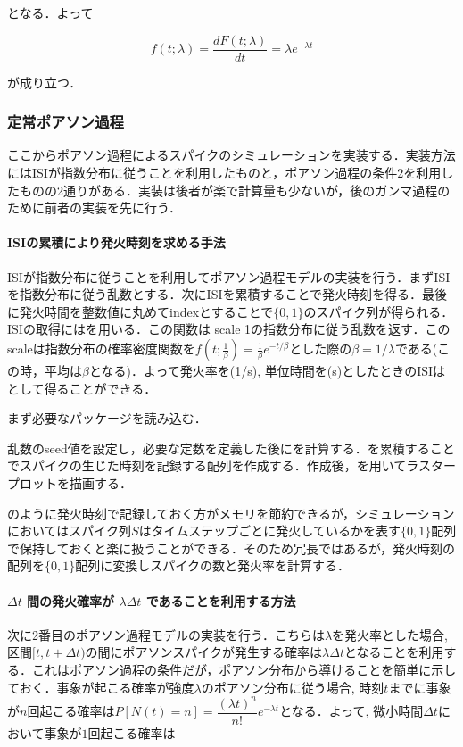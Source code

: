 となる．よって


\begin{equation}
f(t; \lambda)=\frac{dF(t; \lambda)}{dt}=\lambda e^{-\lambda t}
\end{equation}


が成り立つ．
\subsubsection{定常ポアソン過程}
ここからポアソン過程によるスパイクのシミュレーションを実装する．実装方法にはISIが指数分布に従うことを利用したものと，ポアソン過程の条件2を利用したものの2通りがある．実装は後者が楽で計算量も少ないが，後のガンマ過程のために前者の実装を先に行う．

\paragraph{ISIの累積により発火時刻を求める手法}
ISIが指数分布に従うことを利用してポアソン過程モデルの実装を行う．まずISIを指数分布に従う乱数とする．次にISIを累積することで発火時刻を得る．最後に発火時間を整数値に丸めてindexとすることで$\{0, 1\}$のスパイク列が得られる．ISIの取得にはを用いる．この関数は scale 1の指数分布に従う乱数を返す．このscaleは指数分布の確率密度関数を$f(t; \frac{1}{\beta}) = \frac{1}{\beta} e^{-t/\beta}$とした際の$\beta = 1/\lambda$である(この時，平均は$\beta$となる)．よって発火率を(1/s), 単位時間を(s)としたときのISIは として得ることができる．

まず必要なパッケージを読み込む．

乱数のseed値を設定し，必要な定数を定義した後にを計算する．を累積することでスパイクの生じた時刻を記録する配列を作成する．作成後，を用いてラスタープロットを描画する．



のように発火時刻で記録しておく方がメモリを節約できるが，シミュレーションにおいてはスパイク列$S$はタイムステップごとに発火しているかを表す$\{0,1\}$配列で保持しておくと楽に扱うことができる．そのため冗長ではあるが，発火時刻の配列を$\{0,1\}$配列に変換しスパイクの数と発火率を計算する．

\paragraph{$\Delta t$ 間の発火確率が $\lambda\Delta t$ であることを利用する方法}
次に2番目のポアソン過程モデルの実装を行う．こちらは$\lambda$を発火率とした場合, 区間$[t, t+\Delta t)$の間にポアソンスパイクが発生する確率は$\lambda \Delta t$となることを利用する．これはポアソン過程の条件だが，ポアソン分布から導けることを簡単に示しておく．事象が起こる確率が強度$\lambda$のポアソン分布に従う場合, 時刻$t$までに事象が$n$回起こる確率は$P[N(t)=n]=\dfrac{(\lambda t)^{n}}{n !} e^{-\lambda t}$となる．よって, 微小時間$\Delta t$において事象が$1$回起こる確率は


